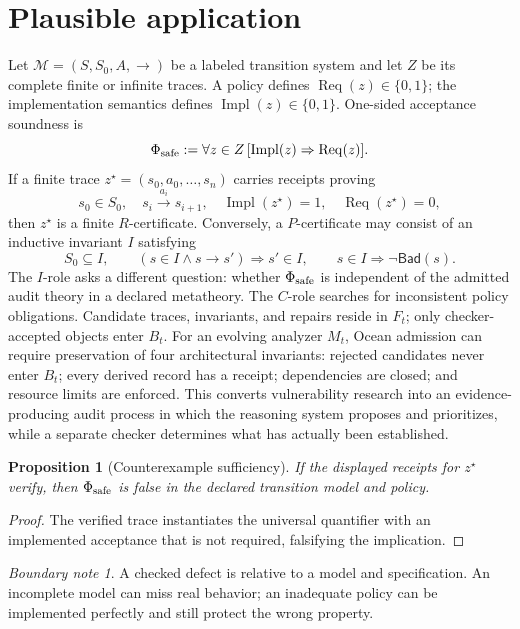 \documentclass[11pt,oneside]{book}
\newtheorem{proposition}[theorem]{Proposition}
\theoremstyle{definition}
\theoremstyle{remark}
\newtheorem{boundary}[theorem]{Boundary note}
\newcommand{\Req}{\operatorname{Req}}
\newcommand{\Impl}{\operatorname{Impl}}
\begin{document}
\section{Plausible application}
Let \(\mathcal M=(S,S_0,A,\to)\) be a labeled transition system and let \(Z\) be its complete finite
or infinite traces. A policy defines \(\Req(z)\in\{0,1\}\); the implementation semantics defines
\(\Impl(z)\in\{0,1\}\). One-sided acceptance soundness is
\[
\Phi_{\rm safe}:=\forall z\in Z\,[\Impl(z)\Rightarrow\Req(z)].
\]
If a finite trace \(z^\star=(s_0,a_0,\ldots,s_n)\) carries receipts proving
\[
s_0\in S_0,\quad s_i\xrightarrow{a_i}s_{i+1},\quad
\Impl(z^\star)=1,\quad \Req(z^\star)=0,
\]
then \(z^\star\) is a finite \(R\)-certificate. Conversely, a \(P\)-certificate may consist of an
inductive invariant \(I\) satisfying
\[
S_0\subseteq I,\qquad
(s\in I\land s\to s')\Rightarrow s'\in I,
\qquad
s\in I\Rightarrow\neg\mathsf{Bad}(s).
\]
The \(I\)-role asks a different question: whether \(\Phi_{\rm safe}\) is independent of the admitted
audit theory in a declared metatheory. The \(C\)-role searches for inconsistent policy obligations.
Candidate traces, invariants, and repairs reside in \(F_t\); only checker-accepted objects enter \(B_t\).
For an evolving analyzer \(M_t\), Ocean admission can require preservation of four architectural
invariants: rejected candidates never enter \(B_t\); every derived record has a receipt; dependencies
are closed; and resource limits are enforced. This converts vulnerability research into an
evidence-producing audit process in which the reasoning system proposes and prioritizes, while a
separate checker determines what has actually been established.

\begin{proposition}[Counterexample sufficiency]
If the displayed receipts for \(z^\star\) verify, then \(\Phi_{\rm safe}\) is false in the declared
transition model and policy.
\end{proposition}

\begin{proof}
The verified trace instantiates the universal quantifier with an implemented acceptance that is not
required, falsifying the implication.
\end{proof}

\begin{boundary}
A checked defect is relative to a model and specification. An incomplete model can miss real behavior;
an inadequate policy can be implemented perfectly and still protect the wrong property.
\end{boundary}
\end{document}
